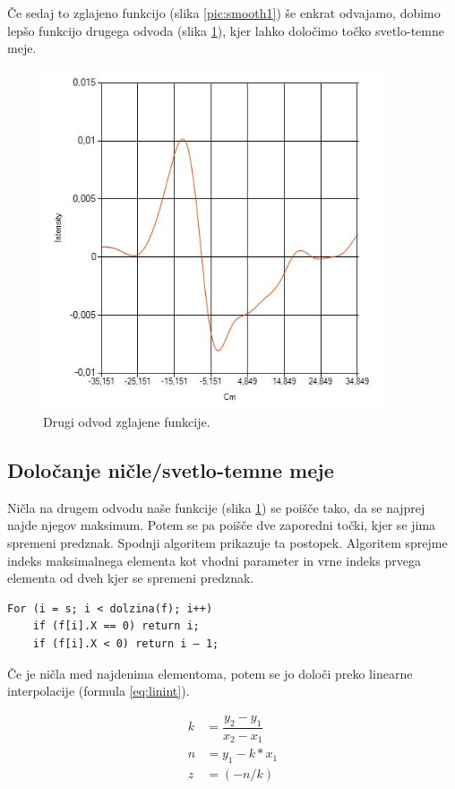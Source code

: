 \documentclass[oneside, a4paper, 12pt]{book}
\begin{document}
Če sedaj to zglajeno funkcijo (slika \ref{pic:smooth1}) še enkrat odvajamo, dobimo lepšo funkcijo drugega odvoda (slika \ref{pic:d22}), kjer lahko določimo točko svetlo-temne meje.

\begin{figure}
\begin{center}
\includegraphics[width=10cm]{slike/drugi-odvod-2.jpg}
\end{center}
\caption{Drugi odvod zglajene funkcije.}
\label{pic:d22}
\end{figure}

\subsection{Določanje ničle/svetlo-temne meje}

Ničla na drugem odvodu naše funkcije (slika \ref{pic:d22}) se poišče tako, da se najprej najde njegov maksimum. Potem  se pa poišče dve zaporedni točki, kjer se jima spremeni predznak. Spodnji algoritem prikazuje ta postopek. Algoritem sprejme indeks maksimalnega elementa kot vhodni parameter in vrne indeks prvega elementa od dveh kjer se spremeni predznak.

\begin{verbatim}
For (i = s; i < dolzina(f); i++)
    if (f[i].X == 0) return i;
    if (f[i].X < 0) return i – 1;
\end{verbatim}

Če je ničla med najdenima elementoma, potem se jo določi preko linearne interpolacije (formula \ref{eq:linint}).

\begin{align}
k &= \dfrac{y_2-y_1}{x_2-x_1}  \nonumber\\
n &= y_1-k*x_1 \nonumber \\
z &= (-n/k) \label{eq:linint}
\end{align} 
\end{document}
